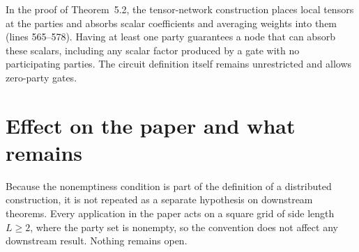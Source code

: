 \documentclass[11pt]{article}
\begin{document}
In the proof of Theorem~5.2, the tensor-network construction places local
tensors at the parties and absorbs scalar coefficients and averaging weights
into them~\cite[proof of Theorem~5.2]{OpenAI2026PolynomialPEPS}
(lines 565--578). Having at least one party guarantees a node that can absorb
these scalars, including any scalar factor produced by a gate with no
participating parties. The circuit definition itself remains unrestricted and
allows zero-party gates.

\section{Effect on the paper and what remains}

Because the nonemptiness condition is part of the definition of a distributed
construction, it is not repeated as a separate hypothesis on downstream
theorems. Every application in the paper acts on a square grid of side length
$L\ge 2$, where the party set is nonempty, so the convention does not affect
any downstream result. Nothing remains open.



\end{document}
